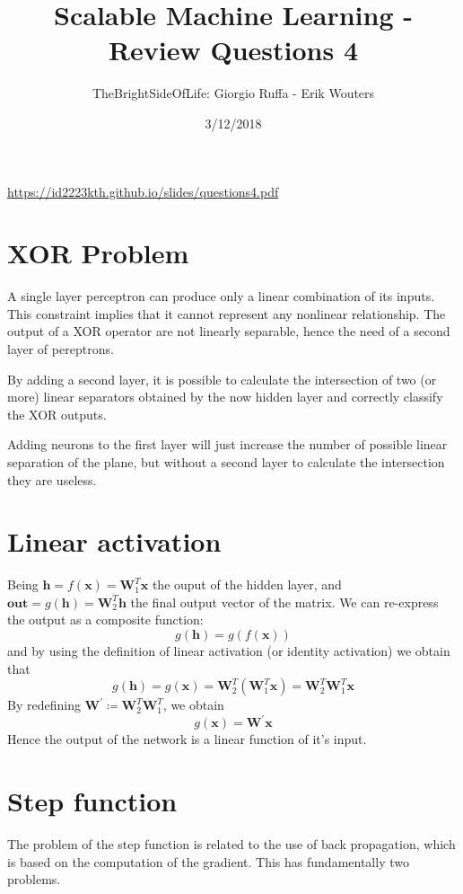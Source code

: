 \documentclass[a4paper]{article}
\title{Scalable Machine Learning - Review Questions 4}
\author{TheBrightSideOfLife: Giorgio Ruffa - Erik Wouters}
\date{3/12/2018}
\begin{document}
\maketitle

\url{https://id2223kth.github.io/slides/questions4.pdf}

\section{XOR Problem}
A single layer perceptron can produce only a linear combination of its inputs. This constraint implies that it cannot represent any nonlinear relationship. The output of a XOR operator are not linearly separable, hence the need of a second layer of pereptrons.

By adding a second layer, it is possible to calculate the intersection of two (or more) linear separators obtained by the now hidden layer and correctly classify the XOR outputs.

Adding neurons to the first layer will just increase the number of possible linear separation of the plane, but without a second layer to calculate the intersection they are useless.

\section{Linear activation}
Being
$
\mathbf{h} = f(\mathbf{x}) = \mathbf{W}_1^{T}\mathbf{x}
$
the ouput of the hidden layer, and 
$
\mathbf{out} = g(\mathbf{h}) = \mathbf{W}_2^{T}\mathbf{h}
$
the final output vector of the matrix. We can re-express the output as a composite function:
\begin{equation}
    g(\mathbf{h}) = g(f(\mathbf{x}))
\end{equation}
and by using the definition of linear activation (or identity activation) we obtain that
\begin{equation}
    g(\mathbf{h}) = g(\mathbf{x}) = \mathbf{W}_2^{T}(\mathbf{W}_1^{T}\mathbf{x}) =  \mathbf{W}_2^{T} \mathbf{W}_1^{T}\mathbf{x}
\end{equation}
By redefining $\mathbf{W}^{\prime} \coloneqq \mathbf{W}_2^{T} \mathbf{W}_1^{T}$, we obtain
\begin{equation}
    g(\mathbf{x}) = \mathbf{W}^{\prime} \mathbf{x}
\end{equation}
Hence the output of the network is a linear function of it's input.

\section{Step function}
The problem of the step function is related to the use of back propagation, which is based on the computation of the gradient. This has fundamentally two problems.
\end{document}
